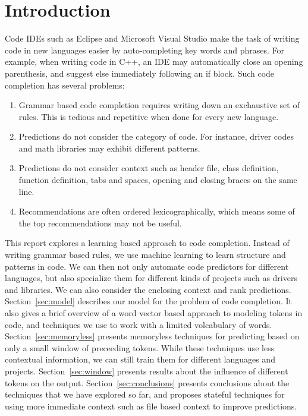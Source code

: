 \section{Introduction}
\label{sec:intro}

\noindent
Code IDEs such as Eclipse and Microsoft Visual Studio make the task of writing
code in new languages easier by auto-completing key words and phrases.
For example, when writing code in C++, an IDE may automatically close an
opening parenthesis, and suggest else immediately following an if block.
Such code completion has several problems:
\begin{enumerate}
  \item Grammar based code completion requires writing down an exchaustive set
    of rules. This is tedious and repetitive when done for every new language.
  \item Predictions do not consider the category of code. For instance, driver
    codes and math libraries may exhibit different patterns.
  \item Predictions do not consider context such as header file, class
    definition, function definition, tabs and spaces, opening and closing
    braces on the same line.
  \item Recommendations are often ordered lexicographically, which means some
    of the top recommendations may not be useful.
\end{enumerate}

This report explores a learning based approach to code completion. Instead of
writing grammar based rules, we use machine learning to learn structure and
patterns in code. We can then not only automate code predictors for different
languages, but also specialize them for different kinds of projects such as
drivers and libraries. We can also consider the enclosing context and rank
predictions.
Section~\ref{sec:model} describes our model for the problem of code completion.
It also gives a brief overview of a word vector based approach to modeling
tokens in code, and techniques we use to work with a limited volcabulary of
words.
Section~\ref{sec:memoryless} presents memoryless techniques for predicting
based on only a small window of preceeding tokens. While these techniques use
less contextual information, we can still train them for different languages
and projects.
Section~\ref{sec:window} presents results about the influence of different
tokens on the output.
Section~\ref{sec:conclusions} presents conclusions about the techniques that we
have explored so far, and proposes stateful techniques for using more immediate
context such as file based context to improve predictions.
